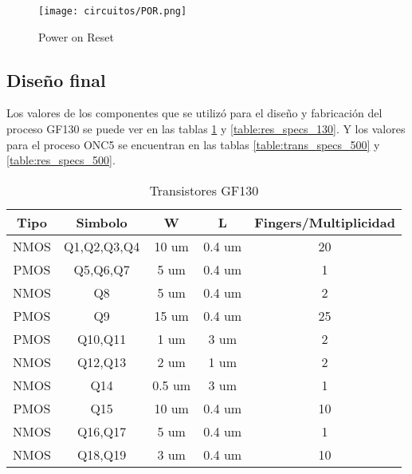 \begin{figure}[H]
\caption{Power on Reset}
\label{fig:por}
\texttt{[image: circuitos/POR.png]}
\centering
\end{figure}

\subsection{Diseño final}

Los valores de los componentes que se utilizó para el diseño y fabricación del proceso GF130 se puede ver en las tablas \ref{table:trans_specs_130} y \ref{table:res_specs_130}. Y los valores para el proceso ONC5 se encuentran en las tablas \ref{table:trans_specs_500} y \ref{table:res_specs_500}.


\begin{table}[H]
\centering
\begin{tabular}{c|c|c|c|c}
\textbf{Tipo}  		 & \textbf{Simbolo}	& \textbf{W}  & \textbf{L}  & \textbf{Fingers/Multiplicidad}  \\ \hline
NMOS                 & Q1,Q2,Q3,Q4    	& 10 um       & 0.4 um      & 20                \\
PMOS                 & Q5,Q6,Q7       	& 5 um        & 0.4 um      & 1                 \\
NMOS                 & Q8             	& 5 um        & 0.4 um      & 2                 \\
PMOS                 & Q9             	& 15 um       & 0.4 um      & 25                \\
PMOS                 & Q10,Q11        	& 1 um        & 3 um        & 2                 \\
NMOS                 & Q12,Q13        	& 2 um        & 1 um        & 2                 \\
NMOS                 & Q14            	& 0.5 um      & 3 um        & 1                 \\
PMOS                 & Q15            	& 10 um       & 0.4 um      & 10                \\
NMOS                 & Q16,Q17        	& 5 um        & 0.4 um      & 1                 \\
NMOS                 & Q18,Q19        	& 3 um        & 0.4 um      & 10                \\
\end{tabular}
\caption{Transistores GF130}
\label{table:trans_specs_130}
\end{table}

